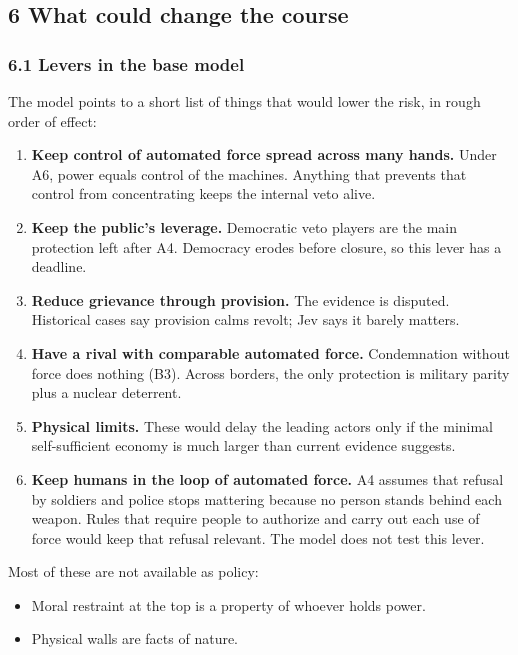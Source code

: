 \documentclass[
  10pt,
]{article}
\providecommand{\tightlist}{%
  \setlength{\itemsep}{0pt}\setlength{\parskip}{0pt}}
\begin{document}
\subsection{6 What could change the course}\label{what-could-change-the-course}

\subsubsection{6.1 Levers in the base model}\label{levers-in-the-base-model}

The model points to a short list of things that would lower the risk, in rough order of effect:

\begin{enumerate}
\def\labelenumi{\arabic{enumi}.}
\tightlist
\item
  \textbf{Keep control of automated force spread across many hands.} Under A6, power equals control
  of the machines. Anything that prevents that control from concentrating keeps the internal veto
  alive.
\item
  \textbf{Keep the public's leverage.} Democratic veto players are the main protection left after
  A4. Democracy erodes before closure, so this lever has a deadline.
\item
  \textbf{Reduce grievance through provision.} The evidence is disputed. Historical cases say
  provision calms revolt; Jev says it barely matters.
\item
  \textbf{Have a rival with comparable automated force.} Condemnation without force does nothing
  (B3). Across borders, the only protection is military parity plus a nuclear deterrent.
\item
  \textbf{Physical limits.} These would delay the leading actors only if the minimal self-sufficient
  economy is much larger than current evidence suggests.
\item
  \textbf{Keep humans in the loop of automated force.} A4 assumes that refusal by soldiers and
  police stops mattering because no person stands behind each weapon. Rules that require people to
  authorize and carry out each use of force would keep that refusal relevant. The model does not
  test this lever.
\end{enumerate}

Most of these are not available as policy:

\begin{itemize}
\tightlist
\item
  Moral restraint at the top is a property of whoever holds power.
\item
  Physical walls are facts of nature.
\end{itemize}
\end{document}

